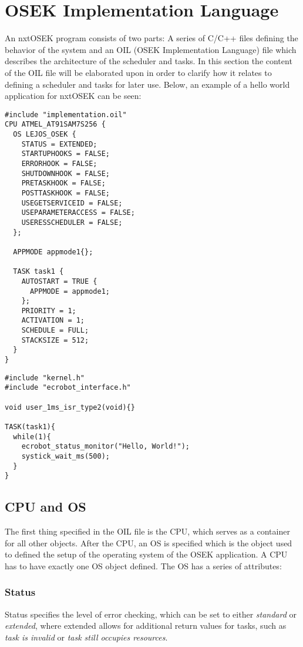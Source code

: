 
\section{OSEK Implementation Language}
An nxtOSEK program consists of two parts: A series of C/C++ files defining the behavior of the system and an OIL (OSEK Implementation Language) file which describes the architecture of the scheduler and tasks.
In this section the content of the OIL file will be elaborated upon in order to clarify how it relates to defining a scheduler and tasks for later use.
Below, an example of a hello world application for nxtOSEK can be seen:
\begin{lstlisting}[caption=OIL]
#include "implementation.oil"
CPU ATMEL_AT91SAM7S256 {
  OS LEJOS_OSEK {
    STATUS = EXTENDED;
    STARTUPHOOKS = FALSE;
    ERRORHOOK = FALSE;
    SHUTDOWNHOOK = FALSE;
    PRETASKHOOK = FALSE;
    POSTTASKHOOK = FALSE;
    USEGETSERVICEID = FALSE;
    USEPARAMETERACCESS = FALSE;
    USERESSCHEDULER = FALSE;
  };
  
  APPMODE appmode1{};

  TASK task1 {
    AUTOSTART = TRUE {
      APPMODE = appmode1;    
    };
    PRIORITY = 1;
    ACTIVATION = 1;
    SCHEDULE = FULL;
    STACKSIZE = 512;
  }
}
\end{lstlisting}

\begin{lstlisting}[caption=C source]
#include "kernel.h"
#include "ecrobot_interface.h"

void user_1ms_isr_type2(void){}

TASK(task1){
  while(1){
    ecrobot_status_monitor("Hello, World!");
    systick_wait_ms(500);
  }
}
\end{lstlisting}

\subsection{CPU and OS}
The first thing specified in the OIL file is the CPU, which serves as a container for all other objects\cite{irisa25}.
After the CPU, an OS is specified which is the object used to defined the setup of the operating system of the OSEK application.
A CPU has to have exactly one OS object defined.
The OS has a series of attributes: 
\subsubsection*{Status}
Status specifies the level of error checking, which can be set to either \textit{standard} or \textit{extended}, where extended allows for additional return values for tasks, such as \textit{task is invalid} or \textit{task still occupies resources}\cite{irisa223}.

